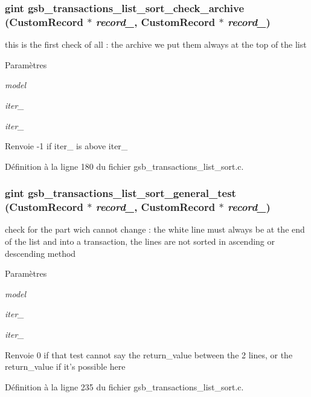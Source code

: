 \subsubsection[{gsb\_\-transactions\_\-list\_\-sort\_\-check\_\-archive}]{\setlength{\rightskip}{0pt plus 5cm}gint gsb\_\-transactions\_\-list\_\-sort\_\-check\_\-archive ({\bf CustomRecord} $\ast$ {\em record\_}, \/  {\bf CustomRecord} $\ast$ {\em record\_})}\label{gsb__transactions__list__sort_8c_a772947a41069fbbef61f4f63c4c25c2f}
this is the first check of all : the archive we put them always at the top of the list


\begin{DoxyParams}{Paramètres}
\item[{\em model}]\item[{\em iter\_\-1}]\item[{\em iter\_\-2}]\end{DoxyParams}
\begin{DoxyReturn}{Renvoie}
-\/1 if iter\_ is above iter\_ 
\end{DoxyReturn}


Définition à la ligne 180 du fichier gsb\_\-transactions\_\-list\_\-sort.c.

\subsubsection[{gsb\_\-transactions\_\-list\_\-sort\_\-general\_\-test}]{\setlength{\rightskip}{0pt plus 5cm}gint gsb\_\-transactions\_\-list\_\-sort\_\-general\_\-test ({\bf CustomRecord} $\ast$ {\em record\_}, \/  {\bf CustomRecord} $\ast$ {\em record\_})}\label{gsb__transactions__list__sort_8c_a40753d7cbe5a9effda9f91b5261116d3}
check for the part wich cannot change : the white line must always be at the end of the list and into a transaction, the lines are not sorted in ascending or descending method


\begin{DoxyParams}{Paramètres}
\item[{\em model}]\item[{\em iter\_\-1}]\item[{\em iter\_\-2}]\end{DoxyParams}
\begin{DoxyReturn}{Renvoie}
0 if that test cannot say the return\_\-value between the 2 lines, or the return\_\-value if it's possible here 
\end{DoxyReturn}


Définition à la ligne 235 du fichier gsb\_\-transactions\_\-list\_\-sort.c.

